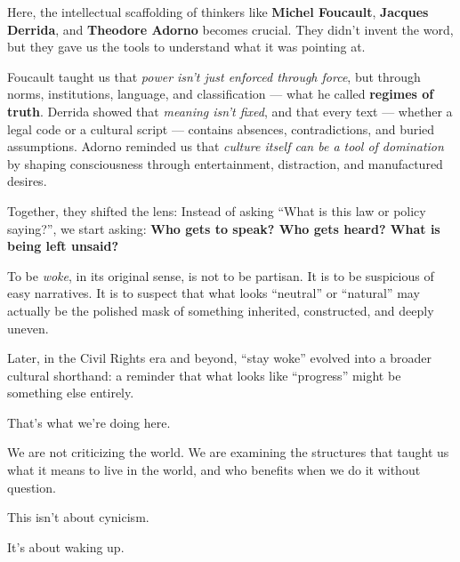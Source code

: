 \medskip

Here, the intellectual scaffolding of thinkers like \textbf{Michel Foucault}, \textbf{Jacques Derrida}, and 
\textbf{Theodore Adorno} 
becomes crucial.  
They didn’t invent the word, but they gave us the tools to understand what it was pointing at.

Foucault taught us that \textit{power isn’t just enforced through force}, but through norms, institutions, language, 
and classification — what he called \textbf{regimes of truth}.  
Derrida showed that \textit{meaning isn’t fixed}, and that every text — whether a legal code or a cultural script — 
contains absences, contradictions, and buried assumptions.
Adorno reminded us that \textit{culture itself can be a tool of domination} by shaping consciousness 
through entertainment, distraction, and manufactured desires.

Together, they shifted the lens:  
Instead of asking ``What is this law or policy saying?'', we start asking:  
\textbf{Who gets to speak? Who gets heard? What is being left unsaid?}

To be \textit{woke}, in its original sense, is not to be partisan.  
It is to be suspicious of easy narratives.  
It is to suspect that what looks ``neutral'' or ``natural'' may actually be the polished mask of something inherited, 
constructed, and deeply uneven.

Later, in the Civil Rights era and beyond, ``stay woke'' evolved into a broader cultural shorthand:  
a reminder that what looks like ``progress'' might be something else entirely.

That’s what we’re doing here.

We are not criticizing the world. We are examining the structures that taught us what it means to live in the world, 
and who benefits when we do it without question.

This isn’t about cynicism.

It’s about waking up.


